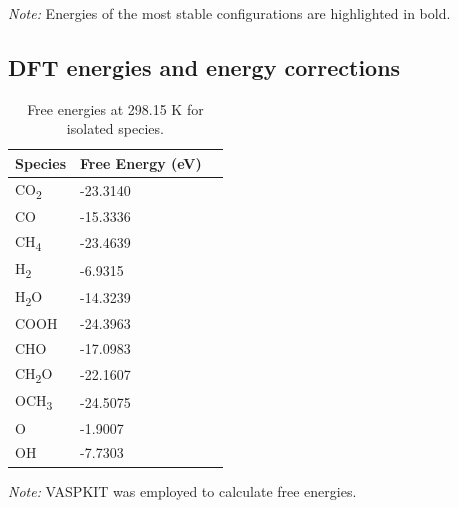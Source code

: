 \begin{table}[htbp]
  \smallskip

  \footnotesize\textit{Note:} Energies of the most stable configurations are highlighted in bold.
\end{table}

\subsection{DFT energies and energy corrections}
\label{supp_sec2.3_energies}

\begin{table}[htbp]
\label{supp_table2:species_free_energies}
  \caption{Free energies at 298.15 K for isolated species.}
  \center
  \small
  \begin{tabularx}{0.5\textwidth}{@{}lXr@{}}
    \toprule
    Species               & Free Energy (eV)  \\
    \midrule
    CO\textsubscript{2}   & -23.3140          \\
    CO                    & -15.3336          \\
    CH\textsubscript{4}   & -23.4639          \\
    H\textsubscript{2}    & -6.9315           \\
    H\textsubscript{2}O   & -14.3239          \\
    COOH                  & -24.3963          \\
    CHO                   & -17.0983          \\
    CH\textsubscript{2}O  & -22.1607          \\
    OCH\textsubscript{3}  & -24.5075          \\
    O                     & -1.9007           \\
    OH                    & -7.7303           \\
    \bottomrule
  \end{tabularx}

  \smallskip

  \begin{flushright}
  \begin{minipage}{\textwidth}
    \footnotesize\textit{Note:} VASPKIT \cite{wang2021vaspkit} was employed to calculate free energies.
  \end{minipage}
  \end{flushright}
\end{table}


